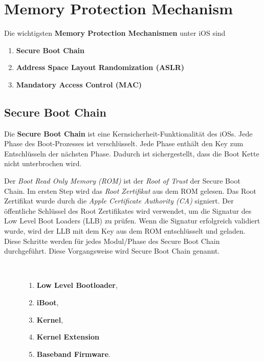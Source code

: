 \section{Memory Protection Mechanism}
\label{sec:MemoryProtection}
Die wichtigsten \textbf{Memory Protection Mechanismen} unter iOS sind
\begin{enumerate}
    \item \textbf{Secure Boot Chain}
    \item \textbf{Address Space Layout Randomization (ASLR)}
    \item \textbf{Mandatory Access Control (MAC)}
\end{enumerate}

\subsection{Secure Boot Chain}
\label{sec:SecBootChain}

Die \textbf{Secure Boot Chain} ist eine Kernsicherheit-Funktionalität des iOSs. Jede Phase des Boot-Prozesses ist verschlüsselt. Jede Phase enthält den Key zum Entschlüsseln der nächsten Phase. Dadurch ist sichergestellt, dass die Boot Kette nicht unterbrochen wird. \par

Der \textit{\glqq Boot Read Only Memory (ROM)\grqq{}} ist der \textit{\glqq Root of Trust\grqq{}} der Secure Boot Chain. Im ersten Step wird das \textit{\glqq Root Zertifikat\grqq{}} aus dem ROM gelesen. Das Root Zertifikat wurde durch die \textit{\glqq Apple Certificate Authority (CA)\grqq{}} signiert. Der öffentliche Schlüssel des Root Zertifikates wird verwendet, um die Signatur des Low Level Boot Loaders (LLB) zu prüfen. Wenn die Signatur erfolgreich validiert wurde, wird der LLB mit dem Key aus dem ROM entschlüsselt und geladen. Diese Schritte werden für jedes Modul/Phase des Secure Boot Chain durchgeführt. Diese Vorgangsweise  wird Secure Boot Chain genannt.

\begin{description}
    \item[\parbox{\textwidth}{Die Secure Boot Chain beinhaltet folgende Module/Phasen}]~\par
   \begin{enumerate}
        \item \textbf{Low Level Bootloader},
        \item \textbf{iBoot},
        \item \textbf{Kernel},
        \item \textbf{Kernel Extension}
        \item \textbf{Baseband Firmware}.
    \end{enumerate}
\end{description} 

